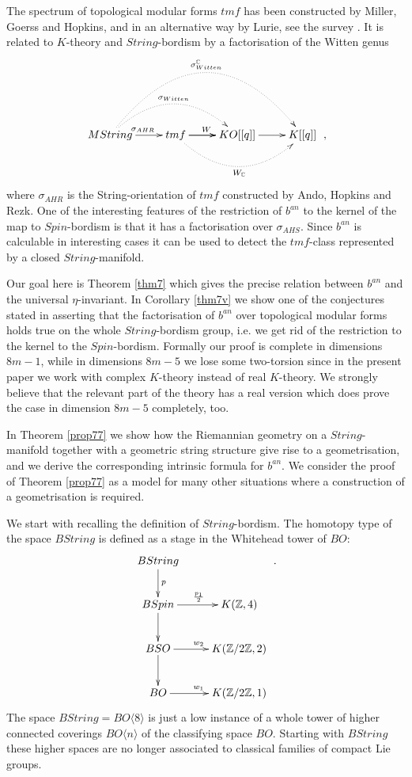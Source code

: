 \documentclass[12pt]{article}
\newcommand{\tmf}{{tmf}}
\newcommand{\Z}{{\mathbb{Z}}}
\newcommand{\C}{{\mathbb{C}}}
\begin{document}
 The spectrum of topological modular forms $\tmf$ has been constructed by Miller, Goerss and Hopkins, and in an alternative way by Lurie, see the survey \cite{MR2597740}. It is related to 
$K$-theory and $String$-bordism by a factorisation of the Witten genus
\begin{equation}\label{gleluzfe}\xymatrix{MString\ar@/^2cm/@{.>}[rrr]^{\sigma^{\C}_{Witten}}\ar@/^1cm/@{.>}[rr]^{\sigma_{Witten}}\ar[r]^{\sigma_{AHR}}&\tmf\ar@/_{1cm}/@{.>}[rr]_{W_{\C}}\ar[r]^{W}\ar[r]&KO[[q]]\ar[r]&K[[q]]}\ ,\end{equation}
where $\sigma_{AHR}$ is the String-orientation of $\tmf$ constructed by  Ando, Hopkins and Rezk.
 One of the interesting features of the restriction of $b^{an}$ to the kernel of the map to $Spin$-bordism is that it has a factorisation over $\sigma_{AHS}$.  Since $b^{an}$ is calculable in interesting cases it can be used to detect the $\tmf$-class represented by a closed $String$-manifold.  
 
  
  
Our goal here is  Theorem \ref{thm7}  which gives the precise relation between $b^{an}$ and the universal $\eta$-invariant. In Corollary \ref{thm7v}
  we show one of the conjectures stated  in  \cite{2009arXiv0912.4875B} asserting that the factorisation of $b^{an}$ over topological modular forms holds true on the whole $String$-bordism group, i.e. we get rid of the restriction to the kernel to the $Spin$-bordism.    Formally our proof is complete in dimensions $8m-1$, while in dimensions $8m-5$ we lose some two-torsion since in the present paper we work with complex $K$-theory instead of real $K$-theory. We strongly believe that the relevant part of the theory has a real version which does prove the case in dimension $8m-5$ completely, too.

In  Theorem  \ref{prop77} we show how the Riemannian geometry on a $String$-manifold together
with a geometric string structure give rise to a geometrisation, and we derive the corresponding intrinsic formula for $b^{an}$.  We consider the proof of Theorem \ref{prop77} as a model for many other situations where a construction of a geometrisation is required.








We start with recalling the definition of $String$-bordism.  The homotopy type of the space $BString$ is defined as a stage in the Whitehead tower of
 $BO$:
$$ \xymatrix{BString\ar[d]^{p}&\\BSpin\ar[d]\ar[r]^{\frac{p_{1}}{2}}&K(\Z,4)\\BSO\ar[d]\ar[r]^{w_{2}}&K(\Z/2\Z,2)\\BO\ar[r]^{w_{1}}&K(\Z/2\Z,1)}\ .$$
The space $BString=BO\langle 8\rangle$ is just a low instance of a whole tower of higher connected coverings  $BO\langle n\rangle$
of the classifying space $BO$. Starting with $BString$ these higher spaces are no longer
associated to classical families of compact Lie groups. 
\end{document}
